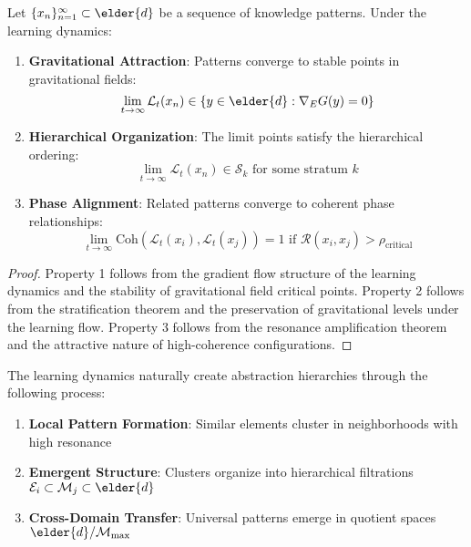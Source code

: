 \begin{theorem}
Let $\{x_n\}_{n=1}^\infty \subset \elder{d}$ be a sequence of knowledge patterns. Under the learning dynamics:
\begin{enumerate}
    \item \textbf{Gravitational Attraction}: Patterns converge to stable points in gravitational fields:
    \begin{equation}
    \lim_{t \rightarrow \infty} \mathcal{L}_t(x_n) \in \{y \in \elder{d} : \nabla_E G(y) = 0\}
    \end{equation}
    
    \item \textbf{Hierarchical Organization}: The limit points satisfy the hierarchical ordering:
    \begin{equation}
    \lim_{t \rightarrow \infty} \mathcal{L}_t(x_n) \in \mathcal{S}_k \text{ for some stratum } k
    \end{equation}
    
    \item \textbf{Phase Alignment}: Related patterns converge to coherent phase relationships:
    \begin{equation}
    \lim_{t \rightarrow \infty} \text{Coh}(\mathcal{L}_t(x_i), \mathcal{L}_t(x_j)) = 1 \text{ if } \mathcal{R}(x_i, x_j) > \rho_{\text{critical}}
    \end{equation}
\end{enumerate}
\end{theorem}

\begin{proof}
Property 1 follows from the gradient flow structure of the learning dynamics and the stability of gravitational field critical points. Property 2 follows from the stratification theorem and the preservation of gravitational levels under the learning flow. Property 3 follows from the resonance amplification theorem and the attractive nature of high-coherence configurations.
\end{proof}

\begin{theorem}
The learning dynamics naturally create abstraction hierarchies through the following process:
\begin{enumerate}
    \item \textbf{Local Pattern Formation}: Similar elements cluster in neighborhoods with high resonance
    \item \textbf{Emergent Structure}: Clusters organize into hierarchical filtrations $\mathcal{E}_i \subset \mathcal{M}_j \subset \elder{d}$
    \item \textbf{Cross-Domain Transfer}: Universal patterns emerge in quotient spaces $\elder{d}/\mathcal{M}_{\max}$
\end{enumerate}
\end{theorem}

